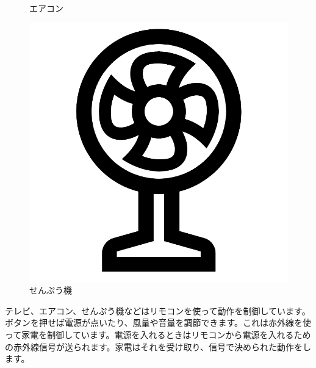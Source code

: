 \begin{figure}[H]
\begin{minipage}[t]{0.3\columnwidth}
    \caption{エアコン}
  \end{minipage}
  \begin{minipage}[t]{0.3\columnwidth}
    \centering
    \includegraphics[scale=0.1]{images/chap05/text05-img040.png}
    \caption{せんぷう機}
  \end{minipage}
\end{figure}

テレビ、エアコン、せんぷう機などはリモコンを使って動作を制御しています。ボタンを押せば電源が点いたり、風量や音量を調節できます。これは赤外線を使って家電を制御しています。電源を入れるときはリモコンから電源を入れるための赤外線信号が送られます。家電はそれを受け取り、信号で決められた動作をします。